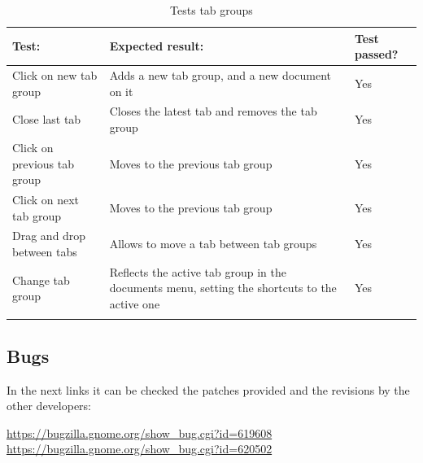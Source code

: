 \begin{table}[H]
  \begin{center}
    \begin{tabularx}{\textwidth}{|X|X|l|}
      \firsthline
      \textbf{Test:} & \textbf{Expected result:} & \textbf{Test passed?} \\
      \hline
      Click on new tab group & Adds a new tab group, and a new document on it & Yes \\
      \hline
      Close last tab & Closes the latest tab and removes the tab group & Yes \\
      \hline
      Click on previous tab group & Moves to the previous tab group & Yes \\
      \hline
      Click on next tab group & Moves to the previous tab group & Yes \\
      \hline
      Drag and drop between tabs & Allows to move a tab between tab groups & Yes \\
      \hline
      Change tab group & Reflects the active tab group in the documents menu, setting the shortcuts to the active one & Yes \\
      \lasthline
    \end{tabularx}
    \caption{Tests tab groups}
  \end{center}
\end{table}

\subsection{Bugs}

In the next links it can be checked the patches provided and the revisions by the other developers:

\noindent\url{https://bugzilla.gnome.org/show_bug.cgi?id=619608} \\
\noindent\url{https://bugzilla.gnome.org/show_bug.cgi?id=620502}

